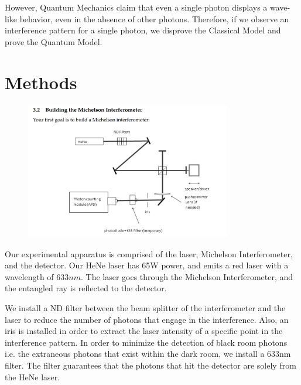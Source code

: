 \documentclass{article}
\numberwithin{equation}{section}
\begin{document}
However, Quantum Mechanics claim that even a single photon displays 
a wave-like behavior, even in the absence of other photons. Therefore, 
if we observe an interference pattern for a single photon, we disprove 
the Classical Model and prove the Quantum Model.  

\section{Methods}


\begin{figure}[h]
    \centering
    \includegraphics[width=0.8\textwidth]{physical.png} %
    \label{fig:setup}
\end{figure}

Our experimental apparatus is comprised of the laser, Michelson Interferometer, 
and the detector. Our HeNe laser has 65W power, and emits a red 
laser with a wavelength of $633nm$. The laser goes through 
the Michelson Interferometer, and the entangled ray is reflected 
to the detector. 

We install a ND filter between the beam splitter of the interferometer 
and the laser to reduce the number of photons that engage in 
the interference. Also, an iris is installed in order to extract 
the laser intensity of a specific point in the interference pattern. 
In order to minimize the detection of black room photons i.e. the extraneous 
photons that exist within the dark room, we install a 
633nm filter. The filter guarantees that the photons that hit the detector 
are solely from the HeNe laser. 
\end{document}
